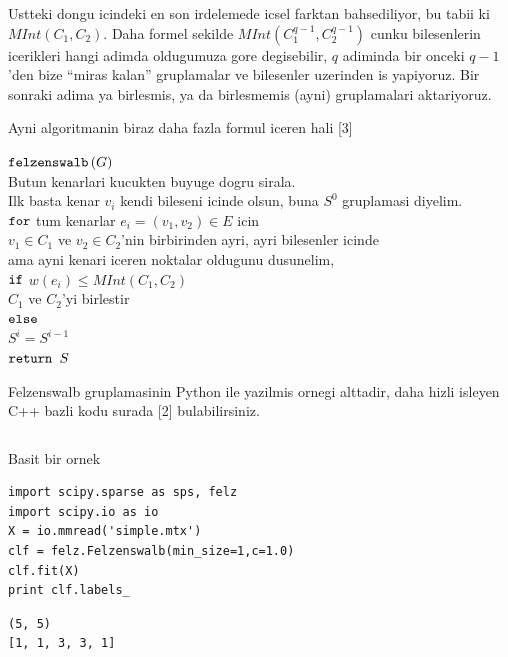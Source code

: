 \documentclass[12pt,fleqn]{article}\usepackage{../common}
\begin{document}
Ustteki dongu icindeki en son irdelemede icsel farktan bahsediliyor, bu
tabii ki $MInt(C_1,C_2)$. Daha formel sekilde $MInt(C_1^{q-1},C_2^{q-1})$
cunku bilesenlerin icerikleri hangi adimda oldugumuza gore degisebilir, $q$
adiminda bir onceki $q-1$'den bize ``miras kalan'' gruplamalar ve
bilesenler uzerinden is yapiyoruz. Bir sonraki adima ya birlesmis, ya da
birlesmemis (ayni) gruplamalari aktariyoruz. 

Ayni algoritmanin biraz daha fazla formul iceren hali [3]

\begin{algorithm}[h]
\begin{pseudocode}
\codename $\mbox{\texttt{felzenswalb}}\left(G\right)$\\
\codeline \> Butun kenarlari kucukten buyuge dogru sirala. \\
\codeline \> Ilk basta kenar $v_i$ kendi bileseni icinde olsun, buna $S^0$ gruplamasi diyelim. \\ 
\codeline \> $\mbox{\texttt{for}}$ tum kenarlar $e_i = (v_1,v_2) \in E$ icin \\
\codeline \> \> $v_1 \in C_1$ ve $v_2 \in C_2$'nin birbirinden ayri, ayri bilesenler icinde \\
\codeline \> \>  ama ayni kenari iceren noktalar oldugunu dusunelim, \\
\codeline \> \> $\mbox{\texttt{if}}$ $w(e_i) \le MInt(C_1,C_2)$ \\
\codeline \> \> \> $C_1$ ve $C_2$'yi birlestir \\
\codeline \> \> $\mbox{\texttt{else}}$ \\
\codeline \> \> \> $S^i = S^{i-1}$ \\
\codeline \> $\mbox{\texttt{return }} S$ 
\end{pseudocode}
\end{algorithm}


Felzenswalb gruplamasinin Python ile yazilmis ornegi alttadir, daha hizli
isleyen C++ bazli kodu surada [2] bulabilirsiniz.

\inputminted[fontsize=\footnotesize]{python}{felz.py}

Basit bir ornek

\begin{verbatim}
import scipy.sparse as sps, felz
import scipy.io as io
X = io.mmread('simple.mtx')
clf = felz.Felzenswalb(min_size=1,c=1.0)
clf.fit(X)
print clf.labels_    
\end{verbatim}

\begin{verbatim}
(5, 5)
[1, 1, 3, 3, 1]
\end{verbatim}
\end{document}
